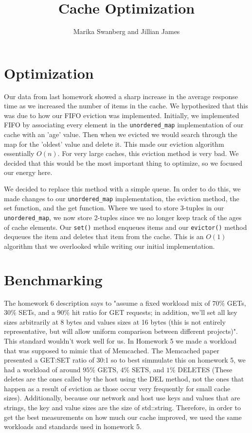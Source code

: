\documentclass[12pt]{article}
\author{Marika Swanberg and Jillian James}
\title{Cache Optimization}
\date{}
\begin{document}
\maketitle
\section{Optimization}
Our data from last homework showed a sharp increase in the average response time as we increased the number of items in the cache. We hypothesized that this was due to how our FIFO eviction was implemented. Initially, we implemented FIFO by associating every element in the \texttt{unordered\_map} implementation of our cache with an 'age' value. Then when we evicted we would search through the map for the 'oldest' value and delete it. This made our eviction algorithm essentially $O(n)$. For very large caches, this eviction method is very bad. We decided that this would be the most important thing to optimize, so we focused our energy here. 

We decided to replace this method with a simple queue. In order to do this, we made changes to our \texttt{unordered\_map} implementation, the eviction method, the set function, and the get function. Where we used to store 3-tuples in our \texttt{unordered\_map}, we now store 2-tuples since we no longer keep track of the ages of cache elements. Our \texttt{set()} method enqueues items and our \texttt{evictor()} method dequeues the item and deletes that item from the cache. This is an $O(1)$ algorithm that we overlooked while writing our initial implementation.


\section{Benchmarking}
The homework 6 description says to "assume a fixed workload mix of $70\%$ GETs, $30\%$ SETs, and a $90\%$ hit ratio for GET requests; in addition, we'll set all key sizes arbitrarily at 8 bytes and values sizes at 16 bytes (this is not entirely representative, but will allow uniform comparison between different projects)". This standard wouldn't work well for us. In Homework 5 we made a workload that was supposed to mimic that of Memcached. The Memcached paper presented a GET:SET ratio of 30:1 so to best simmulate this on homework 5, we had a workload of around $95\%$ GETS, $4\%$ SETS, and $1\%$ DELETES (These deletes are the ones called by the host using the DEL method, not the ones that happen as a result of eviction as those occur very frequently for small cache sizes). Additionally, because our network and host use keys and values that are strings, the key and value sizes are the size of std::string. Therefore, in order to get the best measurements on how much our cache improved, we used the same workloads and standards used in homework 5.
\end{document}
